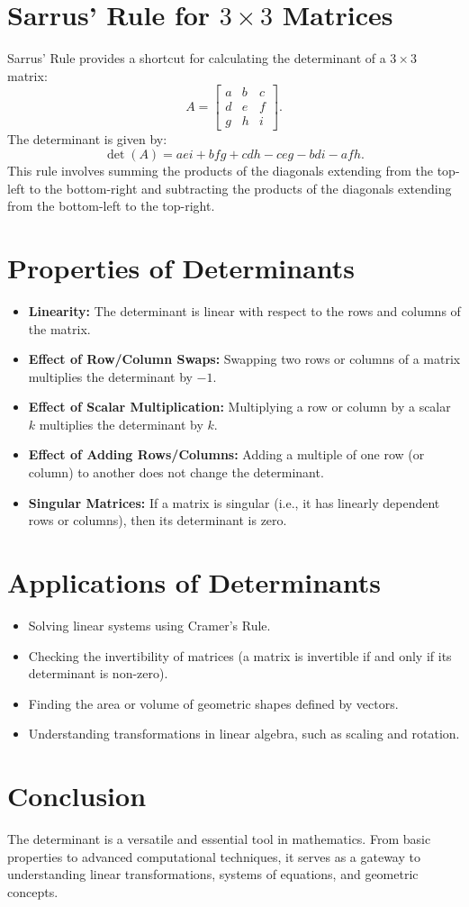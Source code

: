 \documentclass[a4paper,12pt]{article}
\begin{document}
\section{Sarrus' Rule for $3 \times 3$ Matrices}
Sarrus' Rule provides a shortcut for calculating the determinant of a $3 \times 3$ matrix:
\[
A = \begin{bmatrix}
    a & b & c \\
    d & e & f \\
    g & h & i
\end{bmatrix}.
\]
The determinant is given by:
\[
\det(A) = aei + bfg + cdh - ceg - bdi - afh.
\]
This rule involves summing the products of the diagonals extending from the top-left to the bottom-right and subtracting the products of the diagonals extending from the bottom-left to the top-right.

\section{Properties of Determinants}
\begin{itemize}
    \item \textbf{Linearity:} The determinant is linear with respect to the rows and columns of the matrix.
    \item \textbf{Effect of Row/Column Swaps:} Swapping two rows or columns of a matrix multiplies the determinant by $-1$.
    \item \textbf{Effect of Scalar Multiplication:} Multiplying a row or column by a scalar $k$ multiplies the determinant by $k$.
    \item \textbf{Effect of Adding Rows/Columns:} Adding a multiple of one row (or column) to another does not change the determinant.
    \item \textbf{Singular Matrices:} If a matrix is singular (i.e., it has linearly dependent rows or columns), then its determinant is zero.
\end{itemize}

\section{Applications of Determinants}
\begin{itemize}
    \item Solving linear systems using Cramer's Rule.
    \item Checking the invertibility of matrices (a matrix is invertible if and only if its determinant is non-zero).
    \item Finding the area or volume of geometric shapes defined by vectors.
    \item Understanding transformations in linear algebra, such as scaling and rotation.
\end{itemize}

\section*{Conclusion}
The determinant is a versatile and essential tool in mathematics. From basic properties to advanced computational techniques, it serves as a gateway to understanding linear transformations, systems of equations, and geometric concepts.
\end{document}
